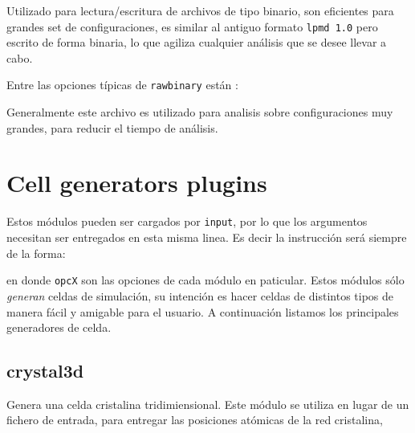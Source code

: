Utilizado para lectura/escritura de archivos de tipo binario, son eficientes
para grandes set de configuraciones, es similar al antiguo formato \texttt{lpmd
1.0} pero escrito de forma binaria, lo que agiliza cualquier an\'alisis que se
desee llevar a cabo.

Entre las opciones t\'ipicas de \verb|rawbinary| est\'an :



Generalmente este archivo es utilizado para analisis sobre configuraciones muy
grandes, para reducir el tiempo de an\'alisis.

\section{Cell generators plugins}
\label{chap:modulos:generadores}

Estos m\'odulos pueden ser cargados por \verb|input|, por lo que los argumentos
necesitan ser entregados en esta misma linea. Es decir la instrucci\'on ser\'a
siempre de la forma:



en donde \verb|opcX| son las opciones de cada m\'odulo en paticular. Estos
m\'odulos s\'olo \textit{generan} celdas de simulaci\'on, su intenci\'on es
hacer celdas de distintos tipos de manera f\'acil y amigable para el usuario. A
continuaci\'on listamos los principales generadores de celda.

\subsection{crystal3d}
Genera una celda cristalina tridimiensional. Este m\'odulo se utiliza en lugar
de un fichero de entrada, para entregar las posiciones at\'omicas de la red
cristalina, 



